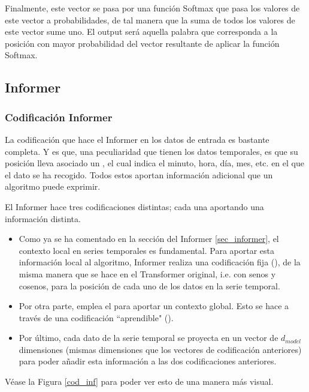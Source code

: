 Finalmente, este vector se pasa por una función Softmax que pasa los valores de este vector a probabilidades, de tal manera que la suma de todos los valores de este vector sume uno. El output será aquella palabra que corresponda a la posición con mayor probabilidad del vector resultante de aplicar la función Softmax. 
\subsection{Informer}

\subsubsection{Codificación Informer}
\label{ap:codif}

La codificación que hace el Informer en los datos de entrada es bastante completa. Y es que, una peculiaridad que tienen los datos temporales, es que su posición lleva asociado un , el cual indica el minuto, hora, día, mes, etc. en el que el dato se ha recogido. Todos estos  aportan información adicional que un algoritmo puede exprimir. 

El Informer hace tres codificaciones distintas; cada una aportando una información distinta. 


\begin{itemize}
    \item Como ya se ha comentado en la sección del Informer  \ref{sec_informer}, el contexto local en series temporales es fundamental. Para aportar esta información local al algoritmo,  Informer \parencite{informer} realiza una codificación fija (), de la misma manera  que se hace en el Transformer original, i.e. con senos y cosenos, para la posición de cada uno de los datos en la serie temporal. 
    \item Por otra parte, emplea el  para aportar un contexto global. Esto se hace a través de una codificación ``aprendible" (). 
    \item Por último, cada dato de la serie temporal se proyecta en un vector de $d_{model}$ dimensiones (mismas dimensiones que los vectores de codificación anteriores) para poder añadir esta información a las dos codificaciones anteriores.
\end{itemize}

Véase la Figura \ref{cod_inf} para poder ver esto de una manera más visual.

